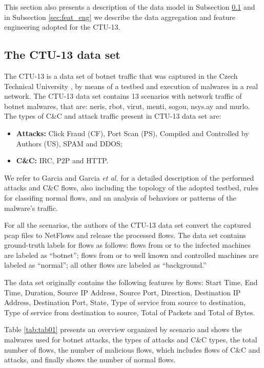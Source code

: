 \documentclass[review]{elsarticle}
\begin{document}
This section also presents a description of the data model in Subsection \ref{sec:CTU-13} and in Subsection \ref{sec:feat_eng} we describe the data aggregation and feature engineering adopted for the CTU-13.

\subsection{The CTU-13 data set}
\label{sec:CTU-13}

The CTU-13 is a data set of botnet traffic that was captured in the Czech Technical University \cite{garcia2014empirical}, by means of a testbed and execution of malwares in a real network. The CTU-13 data set contains 13 scenarios with network traffic of botnet malwares, that are: neris, rbot, virut, menti, sogou, nsys.ay and murlo. The types of C\&C and attack traffic present in CTU-13 data set are:

\begin{itemize}
	\item \textbf{Attacks:} Click Fraud (CF), Port Scan (PS), Compiled and Controlled by Authors (US), SPAM and DDOS;
	\item \textbf{C\&C:} IRC, P2P and HTTP.
\end{itemize}

We refer to Garcia \cite{garcia2014identifying} and Garcia \emph{et al.} \cite{garcia2014empirical} for a detailed description of the performed attacks and C\&C flows, also including the topology of the adopted testbed, rules for classifing normal flows, and an analysis of behaviors or patterns of the malware's traffic.

For all the scenarios, the authors of the CTU-13 data set convert the captured pcap files to NetFlows and release the processed flows. The data set contains ground-truth labels for flows as follows: flows from or to the infected machines are labeled as “botnet”; flows from or to well known and controlled machines are labeled as “normal”; all other flows are labeled as “background.”

The data set originally contains the following features by flows:  Start Time, End Time, Duration, Source IP Address, Source Port, Direction, Destination IP Address, Destination Port, State, Type of service from source to destination, Type of service from destination to source, Total of Packets and Total of Bytes.

Table \ref{tab:tab01} presents an overview organized by scenario and shows the malwares used for botnet attacks, the types of attacks and C\&C types, the total number of flows, the number of malicious flows, which includes flows of C\&C and attacks, and finally shows the number of normal flows.
\end{document}
